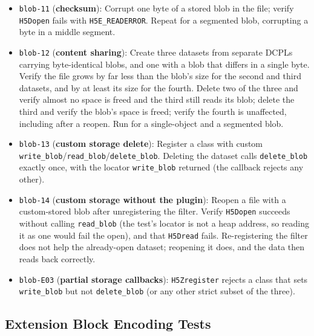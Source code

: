 \documentclass[../RFC-HDFG-2026-003.tex]{subfiles}
\begin{document}
\begin{itemize}
  blob's size (every segment, not just the index).  The debug build is
  the point: the metadata cache asserts on an entry larger than
  \texttt{H5C\_MAX\_ENTRY\_SIZE} (32~MiB) in \texttt{H5C\_insert\_entry},
  and a single-object blob of this size trips that assert --- confirmed by
  running the test with segmentation disabled.
\item \texttt{blob-11} (\textbf{checksum}): Corrupt one byte of a stored
  blob in the file; verify \texttt{H5Dopen} fails with
  \texttt{H5E\_READERROR}.  Repeat for a segmented blob, corrupting a
  byte in a middle segment.
\item \texttt{blob-12} (\textbf{content sharing}): Create three datasets
  from separate DCPLs carrying byte-identical blobs, and one with a blob
  that differs in a single byte.  Verify the file grows by far less than
  the blob's size for the second and third datasets, and by at least its
  size for the fourth.  Delete two of the three and verify almost no space
  is freed and the third still reads its blob; delete the third and verify
  the blob's space is freed; verify the fourth is unaffected, including
  after a reopen.  Run for a single-object and a segmented blob.
\item \texttt{blob-13} (\textbf{custom storage delete}): Register a class
  with custom \texttt{write\_blob}/\texttt{read\_blob}/\texttt{delete\_blob}.
  Deleting the dataset calls \texttt{delete\_blob} exactly once, with the
  locator \texttt{write\_blob} returned (the callback rejects any other).
\item \texttt{blob-14} (\textbf{custom storage without the plugin}):
  Reopen a file with a custom-stored blob after unregistering the filter.
  Verify \texttt{H5Dopen} succeeds without calling \texttt{read\_blob}
  (the test's locator is not a heap address, so reading it as one would
  fail the open), and that \texttt{H5Dread} fails.  Re-registering the
  filter does not help the already-open dataset; reopening it does, and
  the data then reads back correctly.
\item \texttt{blob-E03} (\textbf{partial storage callbacks}):
  \texttt{H5Zregister} rejects a class that sets \texttt{write\_blob} but
  not \texttt{delete\_blob} (or any other strict subset of the three).
\end{itemize}

\subsection{Extension Block Encoding Tests}
\label{sec:test-blob-block}
\end{document}

